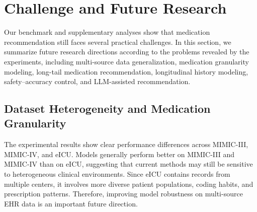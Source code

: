 \documentclass[manuscript,review]{acmart}
\begin{document}





\section{Challenge and Future Research}
\label{sec:challenge}

Our benchmark and supplementary analyses show that medication recommendation still faces several practical challenges. In this section, we summarize future research directions according to the problems revealed by the experiments, including multi-source data generalization, medication granularity modeling, long-tail medication recommendation, longitudinal history modeling, safety--accuracy control, and LLM-assisted recommendation.

\subsection{Dataset Heterogeneity and Medication Granularity}

The experimental results show clear performance differences across MIMIC-III, MIMIC-IV, and eICU. Models generally perform better on MIMIC-III and MIMIC-IV than on eICU, suggesting that current methods may still be sensitive to heterogeneous clinical environments. Since eICU contains records from multiple centers, it involves more diverse patient populations, coding habits, and prescription patterns. Therefore, improving model robustness on multi-source EHR data is an important future direction.
\end{document}
